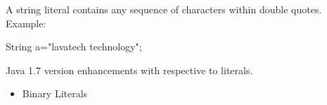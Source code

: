 
\begin{flushleft}
	
	A string literal contains any sequence of characters within double quotes.
	\newline
	Example:
	\begin{tcolorbox}[breakable,notitle,boxrule=-0pt,colback=code,colframe=code]
		\color{black}
		\font=8pt
		String a="lavatech technology";
		\font=4pt
	\end{tcolorbox}	
	
	Java 1.7 version enhancements with respective to literals.
	\begin{itemize}
		\item Binary Literals
	\end{itemize}

\end{flushleft}

\newpage


